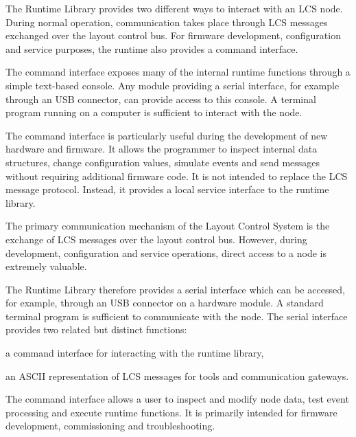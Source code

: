 %

The Runtime Library provides two different ways to interact with an LCS node. During
normal operation, communication takes place through LCS messages exchanged over the
layout control bus. For firmware development, configuration and service purposes, the
runtime also provides a command interface.

The command interface exposes many of the internal runtime functions through a simple
text-based console. Any module providing a serial interface, for example through an USB
connector, can provide access to this console. A terminal program running on a computer
is sufficient to interact with the node.

The command interface is particularly useful during the development of new hardware and
firmware. It allows the programmer to inspect internal data structures, change
configuration values, simulate events and send messages without requiring additional
firmware code. It is not intended to replace the LCS message protocol. Instead, it
provides a local service interface to the runtime library.


The primary communication mechanism of the Layout Control System is the exchange of
LCS messages over the layout control bus. However, during development, configuration
and service operations, direct access to a node is extremely valuable.

The Runtime Library therefore provides a serial interface which can be accessed, for
example, through an USB connector on a hardware module. A standard terminal program is
sufficient to communicate with the node. The serial interface provides two related 
but distinct functions:

\begin{smallGapItemize}
    \item a command interface for interacting with the runtime library,
    \item an ASCII representation of LCS messages for tools and communication gateways.
\end{smallGapItemize}

The command interface allows a user to inspect and modify node data, test event
processing and execute runtime functions. It is primarily intended for firmware
development, commissioning and troubleshooting.

